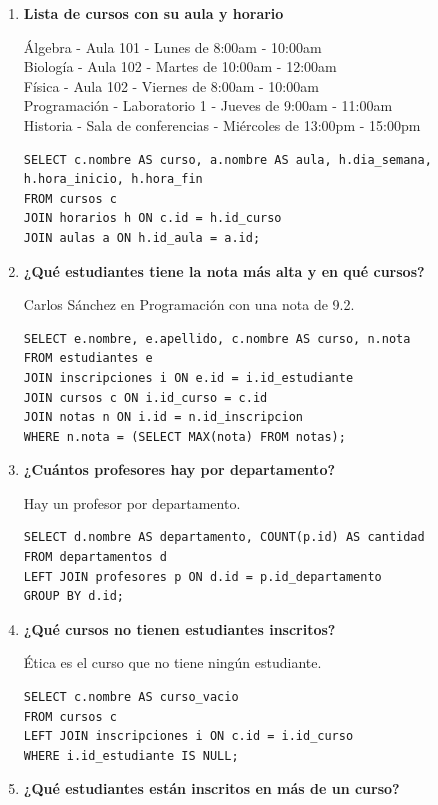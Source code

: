 \documentclass[11pt,letterpaper]{article}
\begin{document}
\begin{enumerate}
    \item \textbf{Lista de cursos con su aula y horario}
    
    Álgebra - Aula 101 - Lunes de 8:00am - 10:00am\\
    Biología - Aula 102 - Martes de 10:00am - 12:00am\\
    Física - Aula 102 - Viernes de 8:00am - 10:00am\\
    Programación - Laboratorio 1 - Jueves de 9:00am - 11:00am\\
    Historia - Sala de conferencias - Miércoles de 13:00pm - 15:00pm
\begin{lstlisting}
SELECT c.nombre AS curso, a.nombre AS aula, h.dia_semana, h.hora_inicio, h.hora_fin
FROM cursos c
JOIN horarios h ON c.id = h.id_curso
JOIN aulas a ON h.id_aula = a.id;
\end{lstlisting}

    \item \textbf{¿Qué estudiantes tiene la nota más alta y en qué cursos?}
    
    Carlos Sánchez en Programación con una nota de 9.2.
\begin{lstlisting}
SELECT e.nombre, e.apellido, c.nombre AS curso, n.nota
FROM estudiantes e
JOIN inscripciones i ON e.id = i.id_estudiante
JOIN cursos c ON i.id_curso = c.id
JOIN notas n ON i.id = n.id_inscripcion
WHERE n.nota = (SELECT MAX(nota) FROM notas);
\end{lstlisting}

    \item \textbf{¿Cuántos profesores hay por departamento?}
    
    Hay un profesor por departamento.
\begin{lstlisting}
SELECT d.nombre AS departamento, COUNT(p.id) AS cantidad
FROM departamentos d
LEFT JOIN profesores p ON d.id = p.id_departamento
GROUP BY d.id;
\end{lstlisting}

    \item \textbf{¿Qué cursos no tienen estudiantes inscritos?}
    
    Ética es el curso que no tiene ningún estudiante.
\begin{lstlisting}
SELECT c.nombre AS curso_vacio
FROM cursos c
LEFT JOIN inscripciones i ON c.id = i.id_curso
WHERE i.id_estudiante IS NULL;
\end{lstlisting}

    \item \textbf{¿Qué estudiantes están inscritos en más de un curso?}
    

\end{enumerate}
\end{document}
